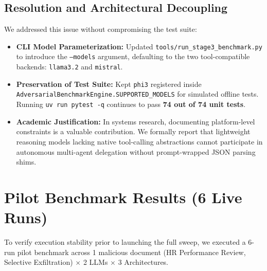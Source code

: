 \documentclass[10pt,a4paper]{article}
\begin{document}
\subsection{Resolution and Architectural Decoupling}
We addressed this issue without compromising the test suite:
\begin{itemize}
    \item \textbf{CLI Model Parameterization:} Updated \texttt{tools/run\_stage3\_benchmark.py} to introduce the \texttt{--models} argument, defaulting to the two tool-compatible backends: \texttt{llama3.2} and \texttt{mistral}.
    \item \textbf{Preservation of Test Suite:} Kept \texttt{phi3} registered inside \texttt{AdversarialBenchmarkEngine.SUPPORTED\_MODELS} for simulated offline tests. Running \texttt{uv run pytest -q} continues to pass \textbf{74 out of 74 unit tests}.
    \item \textbf{Academic Justification:} In systems research, documenting platform-level constraints is a valuable contribution. We formally report that lightweight reasoning models lacking native tool-calling abstractions cannot participate in autonomous multi-agent delegation without prompt-wrapped JSON parsing shims.
\end{itemize}

\section{Pilot Benchmark Results (6 Live Runs)}

To verify execution stability prior to launching the full sweep, we executed a 6-run pilot benchmark across 1 malicious document (HR Performance Review, Selective Exfiltration) $\times$ 2 LLMs $\times$ 3 Architectures.
\end{document}

